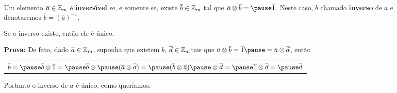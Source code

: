 \documentclass{beamer}
\begin{document}
    \begin{frame}
        \begin{definicao}
            Um elemento $\overline{a} \in \mathbb{Z}_m$ {\'e} \textbf{invers{\'\i}vel} \pause se, e somente se, existe $\overline{b} \in \mathbb{Z}_m$ \pause tal que $\overline{a} \otimes \overline{b} = \pause \overline{1}$. \pause Neste caso, $\overline{b}$  chamado \textbf{inverso} de $\overline{a}$ \pause e denotaremos $\overline{b} = (\overline{a})^{-1}$.\pause
        \end{definicao}

        \begin{proposicao}
            Se o inverso existe, \pause ent\~ao ele {\'e} {\'u}nico.\pause
        \end{proposicao}
        \noindent \textbf{Prova:}
            De fato, \pause dado $\overline{a} \in \mathbb{Z}_m$, \pause suponha que existem $\overline{b}$, \pause $\overline{d} \in \mathbb{Z}_m$\pause tais que $\overline{a} \otimes \overline{b} = \overline{1} \pause = \overline{a} \otimes \overline{d}$, \pause ent{\~a}o\pause
            \begin{center}
                \begin{tabular}{l}
                    $\overline{b} = \pause \overline{b} \otimes \overline{1} = \pause \overline{b} \otimes \pause (\overline{a} \otimes \overline{d}) = \pause (\overline{b} \otimes \overline{a}) \pause \otimes \overline{d} = \pause \overline{1} \otimes \overline{d} = \pause \overline{d}$\pause
                \end{tabular}
            \end{center}
        Portanto o inverso de $\overline{a}$ é único, como queríamos. \hspace{.5cm}\qedsymbol\pause
    \end{frame}
\end{document}
